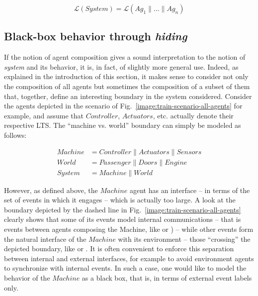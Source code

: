 \begin{equation}
\mathcal{L}(System) = \mathcal{L}(Ag_1 \parallel \ldots \parallel Ag_n)
\label{equation:system-composition}
\end{equation}

\subsection{Black-box behavior through \emph{hiding}}

If the notion of agent composition gives a sound interpretation to the notion of \emph{system} and its behavior, it is, in fact, of slightly more general use. Indeed, as explained in the introduction of this section, it makes sense to consider not only the composition of all agents but sometimes the composition of a subset of them that, together, define an interesting boundary in the system considered. Consider the agents depicted in the scenario of Fig.~\ref{image:train-scenario-all-agents} for example, and assume that $Controller$, $Actuators$, etc. actually denote their respective LTS. The ``machine vs. world'' boundary can simply be modeled as follows:

\vspace{-0.8cm}
\begin{align*}
Machine &= Controller \parallel Actuators \parallel Sensors \\
World   &= Passenger \parallel Doors \parallel Engine \\
System  &= Machine \parallel World
\end{align*}
\vspace{-0.8cm}

However, as defined above, the $Machine$ agent has an interface -- in terms of the set of events in which it engages -- which is actually too large. A look at the boundary depicted by the dashed line in Fig.~\ref{image:train-scenario-all-agents} clearly shows that some of its events model internal communications -- that is events between agents composing the Machine, like  or ) -- while other events form the natural interface of the $Machine$ with its environment -- those ``crossing'' the depicted boundary, like  or . It is often convenient to enforce this separation between internal and external interfaces, for example to avoid environment agents to synchronize with internal events. In such a case, one would like to model the behavior of the $Machine$ as a black box, that is, in terms of external event labels only.

